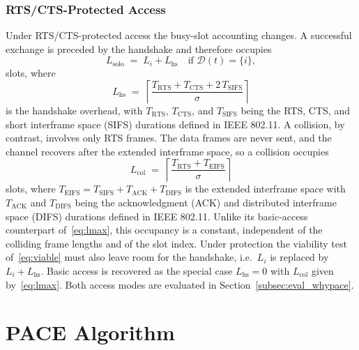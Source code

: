 \documentclass[a4paper,fleqn]{cas-dc}
\begin{document}
\subsubsection{RTS/CTS-Protected Access}
Under RTS/CTS-protected access the busy-slot accounting changes. A successful exchange is preceded by the handshake and therefore occupies
\begin{equation}
    L_\mathrm{solo} \;=\; L_i + L_\mathrm{hs} \quad \text{if } \mathcal{D}(t)=\{i\},
    \label{eq:lsolo_rts}
\end{equation}
slots, where
\begin{equation}
    L_\mathrm{hs} \;=\; \left\lceil
    \frac{T_\mathrm{RTS} + T_\mathrm{CTS} + 2\,T_\mathrm{SIFS}}{\sigma}
    \right\rceil
    \label{eq:oh_rts}
\end{equation}
is the handshake overhead, with $T_\mathrm{RTS}$, $T_\mathrm{CTS}$, and $T_\mathrm{SIFS}$ being the RTS, CTS, and short interframe space (SIFS) durations defined in IEEE 802.11. A collision, by contrast, involves only RTS frames. The data frames are never sent, and the channel recovers after the extended interframe space, so a collision occupies
\begin{equation}
    L_\mathrm{col} \;=\; \left\lceil
    \frac{T_\mathrm{RTS} + T_\mathrm{EIFS}}{\sigma} \right\rceil
    \label{eq:coll_rts}
\end{equation}
slots, where $T_\mathrm{EIFS}=T_\mathrm{SIFS}+T_\mathrm{ACK}+T_\mathrm{DIFS}$ is the extended interframe space with $T_\mathrm{ACK}$ and $T_\mathrm{DIFS}$ being the acknowledgment (ACK) and distributed interframe space (DIFS) durations defined in IEEE 802.11. Unlike its basic-access counterpart of~\eqref{eq:lmax}, this occupancy is a constant, independent of the colliding frame lengths and of the slot index. Under protection the viability test of~\eqref{eq:viable} must also leave room for the handshake, i.e.\ $L_i$ is replaced by $L_i+L_\mathrm{hs}$. Basic access is recovered as the special case $L_\mathrm{hs}=0$ with $L_\mathrm{col}$ given by~\eqref{eq:lmax}. Both access modes are evaluated in Section~\ref{subsec:eval_whypace}.

\section{PACE Algorithm}
\label{sec:pace_algorithm}
\end{document}
